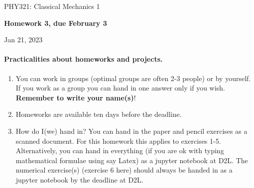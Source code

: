 \documentclass[%
oneside,                 %
final,                   %
10pt]{article}
\begin{document}

\newcommand{\exercisesection}[1]{\subsection*{#1}}






\thispagestyle{empty}

\begin{center}
{\LARGE\bf
\begin{spacing}{1.25}
PHY321: Classical Mechanics 1
\end{spacing}
}
\end{center}


\begin{center}
{\bf Homework 3, due February 3${}^{}$} \\ [0mm]
\end{center}

\begin{center}
\end{center}
    

\begin{center}
Jan 21, 2023
\end{center}

\vspace{1cm}


\paragraph{Practicalities about  homeworks and projects.}
\begin{enumerate}
\item You can work in groups (optimal groups are often 2-3 people) or by yourself. If you work as a group you can hand in one answer only if you wish. \textbf{Remember to write your name(s)}!

\item Homeworks are available ten days  before the deadline. 

\item How do I(we)  hand in?  You can hand in the paper and pencil exercises as a  scanned document. For this homework this applies to exercises 1-5. Alternatively, you can hand in everything (if you are ok with typing mathematical formulae using say Latex) as a jupyter notebook at D2L. The numerical exercise(s) (exercise 6 here) should always be handed in as a jupyter notebook by the deadline at D2L. 
\end{enumerate}
\end{document}
